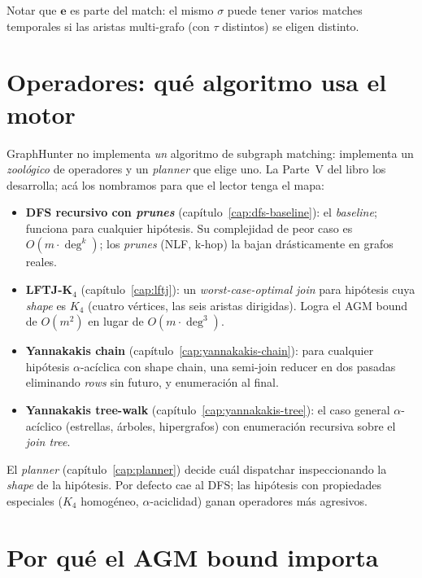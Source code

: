 \noindent
Notar que \(\mathbf{e}\) es parte del match: el mismo \(\sigma\)
puede tener varios matches temporales si las aristas multi-grafo
(con \(\tau\) distintos) se eligen distinto.

\section{Operadores: qué algoritmo usa el motor}

GraphHunter no implementa \emph{un} algoritmo de subgraph matching:
implementa un \emph{zoológico} de operadores y un \emph{planner} que
elige uno. La Parte~V del libro los desarrolla; acá los nombramos para
que el lector tenga el mapa:

\begin{itemize}
    \item \textbf{DFS recursivo con \emph{prunes}}
    (capítulo~\ref{cap:dfs-baseline}): el \emph{baseline}; funciona
    para cualquier hipótesis. Su complejidad de peor caso es
    \(O(m \cdot \deg^k)\); los \emph{prunes} (NLF, k-hop) la bajan
    drásticamente en grafos reales.
    \item \textbf{LFTJ-K\(_4\)} (capítulo~\ref{cap:lftj}): un
    \emph{worst-case-optimal join} para hipótesis cuya \emph{shape}
    es \(K_4\) (cuatro vértices, las seis aristas dirigidas). Logra
    el AGM bound de \(O(m^2)\) en lugar de \(O(m \cdot \deg^3)\).
    \item \textbf{Yannakakis chain}
    (capítulo~\ref{cap:yannakakis-chain}): para cualquier hipótesis
    \(\alpha\)-acíclica con shape chain, una semi-join reducer en
    dos pasadas eliminando \emph{rows} sin futuro, y enumeración al
    final.
    \item \textbf{Yannakakis tree-walk}
    (capítulo~\ref{cap:yannakakis-tree}): el caso general
    \(\alpha\)-acíclico (estrellas, árboles, hipergrafos) con
    enumeración recursiva sobre el \emph{join tree}.
\end{itemize}

El \emph{planner} (capítulo~\ref{cap:planner}) decide cuál
dispatchar inspeccionando la \emph{shape} de la hipótesis. Por
defecto cae al DFS; las hipótesis con propiedades especiales
(\(K_4\) homogéneo, \(\alpha\)-aciclidad) ganan operadores más
agresivos.

\section{Por qué el AGM bound importa}

